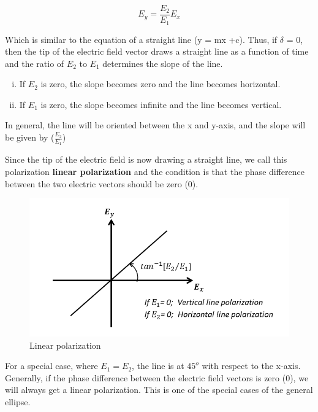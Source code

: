 \begin{equation}
E_y = \frac{E_2}{E_1}E_x
\end{equation}

Which is similar to the equation of a straight line (y = mx +c). Thus, if $\delta$ = 0, then the tip of the electric field vector draws a straight line as a function of time and the ratio of $ E_2 $ to $ E_1 $ determines the slope of the line.
\begin{enumerate}[(i)]
\item If $ E_2 $ is zero, the slope becomes zero and the line becomes horizontal.
\item If $ E_1 $ is zero, the slope becomes infinite and the line becomes vertical.
\end{enumerate} 
In general, the line will be oriented between the x and y-axis, and the slope will be given by ($\frac{E_2}{E_1}$)

Since the tip of the electric field is now drawing a straight line, we call this polarization \textbf {linear polarization} and the condition is that the phase difference between the two electric vectors should be zero (0).
\begin{figure}[h]
\centering
\includegraphics[width=1\linewidth]{graphics/linear_polarization}
\caption{Linear polarization}
\end{figure}

For a special case, where $  E_1=E_2 $, the line is at $ 45^{o}$ with respect to the x-axis. Generally, if the phase difference between the electric field vectors is zero (0), we will always get a linear polarization. This is one of the special cases of the general ellipse.

